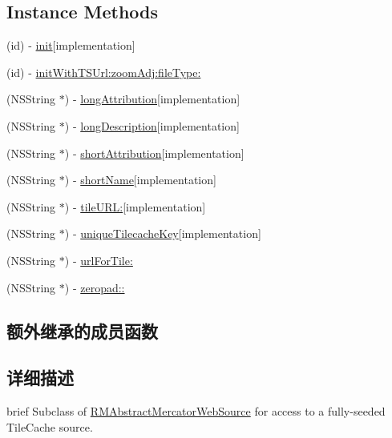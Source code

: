 \subsection*{Instance Methods}
\begin{DoxyCompactItemize}
\item 
(id) -\/ \hyperlink{interface_r_m_tile_cache_source_a1991da8b9143df226620c9283792dab0}{init}{\ttfamily  \mbox{[}implementation\mbox{]}}
\item 
(id) -\/ \hyperlink{interface_r_m_tile_cache_source_a5f243f44edfd85f3a7d392e5167fef15}{init\-With\-T\-S\-Url\-:zoom\-Adj\-:file\-Type\-:}
\item 
(N\-S\-String $\ast$) -\/ \hyperlink{interface_r_m_tile_cache_source_adc0c3fa292e6dd1fc59534be0d9eea26}{long\-Attribution}{\ttfamily  \mbox{[}implementation\mbox{]}}
\item 
(N\-S\-String $\ast$) -\/ \hyperlink{interface_r_m_tile_cache_source_a851d9a72047bd81351ec5dacb618c09f}{long\-Description}{\ttfamily  \mbox{[}implementation\mbox{]}}
\item 
(N\-S\-String $\ast$) -\/ \hyperlink{interface_r_m_tile_cache_source_a700f4bcc6a9bbffb852d01eb425f8cfb}{short\-Attribution}{\ttfamily  \mbox{[}implementation\mbox{]}}
\item 
(N\-S\-String $\ast$) -\/ \hyperlink{interface_r_m_tile_cache_source_a9d81b865c2a4ebb2757f2c1871fb6183}{short\-Name}{\ttfamily  \mbox{[}implementation\mbox{]}}
\item 
(N\-S\-String $\ast$) -\/ \hyperlink{interface_r_m_tile_cache_source_a56bc01bcf515d76f547f84d79f9773e9}{tile\-U\-R\-L\-:}{\ttfamily  \mbox{[}implementation\mbox{]}}
\item 
(N\-S\-String $\ast$) -\/ \hyperlink{interface_r_m_tile_cache_source_a0fc37a76b0161717c4bf0de4a03d5fe0}{unique\-Tilecache\-Key}{\ttfamily  \mbox{[}implementation\mbox{]}}
\item 
(N\-S\-String $\ast$) -\/ \hyperlink{interface_r_m_tile_cache_source_aaefb15155c82f992802db53a7f4c5ef2}{url\-For\-Tile\-:}
\item 
(N\-S\-String $\ast$) -\/ \hyperlink{interface_r_m_tile_cache_source_af79808cc8d2de870bcfe7ff7624fa4c2}{zeropad\-::}
\end{DoxyCompactItemize}
\subsection*{额外继承的成员函数}


\subsection{详细描述}
brief Subclass of \hyperlink{interface_r_m_abstract_mercator_web_source}{R\-M\-Abstract\-Mercator\-Web\-Source} for access to a fully-\/seeded Tile\-Cache source. 

